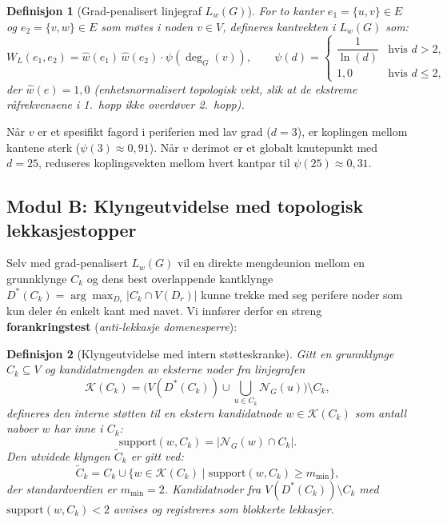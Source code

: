 \documentclass[11pt,a4paper]{article}
\newtheorem{definition}{Definisjon}
\begin{document}
\begin{definition}[Grad-penalisert linjegraf $L_w(G)$]
For to kanter $e_1 = \{u, v\} \in E$ og $e_2 = \{v, w\} \in E$ som møtes i noden $v \in V$, defineres kantvekten i $L_w(G)$ som:
\begin{equation}
  W_L(e_1, e_2) = \hat{w}(e_1)\,\hat{w}(e_2) \cdot \psi(\deg_G(v)), \qquad
  \psi(d) = \begin{cases}
    \dfrac{1}{\ln(d)} & \text{hvis } d > 2, \\[8pt]
    1{,}0 & \text{hvis } d \le 2,
  \end{cases}
\end{equation}
der $\hat{w}(e) = 1{,}0$ (enhetsnormalisert topologisk vekt, slik at de ekstreme råfrekvensene i 1.\ hopp ikke overdøver 2.\ hopp).
\end{definition}

Når $v$ er et spesifikt fagord i periferien med lav grad ($d=3$), er koplingen mellom kantene sterk ($\psi(3) \approx 0{,}91$). Når $v$ derimot er et globalt knutepunkt med $d=25$, reduseres koplingsvekten mellom hvert kantpar til $\psi(25) \approx 0{,}31$.

\subsection{Modul B: Klyngeutvidelse med topologisk lekkasjestopper}
Selv med grad-penalisert $L_w(G)$ vil en direkte mengdeunion mellom en grunnklynge $C_k$ og dens best overlappende kantklynge $D^*(C_k) = \arg\max_{D_r} |C_k \cap V(D_r)|$ kunne trekke med seg perifere noder som kun deler én enkelt kant med navet. Vi innfører derfor en streng \textbf{forankringstest} (\emph{anti-lekkasje domenesperre}):

\begin{definition}[Klyngeutvidelse med intern støtteskranke]
Gitt en grunnklynge $C_k \subseteq V$ og kandidatmengden av eksterne noder fra linjegrafen
\[
  \mathcal{K}(C_k) = \big(V(D^*(C_k)) \cup \bigcup_{u \in C_k} \mathcal{N}_G(u)\big) \setminus C_k,
\]
defineres den interne støtten til en ekstern kandidatnode $w \in \mathcal{K}(C_k)$ som antall naboer $w$ har inne i $C_k$:
\begin{equation}
  \text{support}(w, C_k) = |\mathcal{N}_G(w) \cap C_k|.
\end{equation}
Den utvidede klyngen $\widetilde{C}_k$ er gitt ved:
\begin{equation}
  \widetilde{C}_k = C_k \cup \big\{ w \in \mathcal{K}(C_k) \;\big|\; \text{support}(w, C_k) \ge m_{\min} \big\},
\end{equation}
der standardverdien er $m_{\min} = 2$. Kandidatnoder fra $V(D^*(C_k)) \setminus C_k$ med $\text{support}(w, C_k) < 2$ avvises og registreres som blokkerte lekkasjer.
\end{definition}
\end{document}
